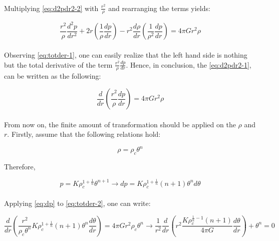 \documentclass[letterpaper,12pt]{article}
\begin{document}
\paragraph{}Multiplying \eqref{eq:d2pdr2-2} with $\frac{r^2}{\rho}$ and rearranging the terms yields:

\begin{equation}
    \label{eq:totder-1}
    \frac{r^2}{\rho}\frac{d^2p}{dr^2} + 2r\left(\frac{1}{\rho}\frac{dp}{dr}\right) - r^2\frac{d\rho}{dr}\left(\frac{1}{\rho^2}\frac{dp}{dr}\right) = 4\pi G r^2 \rho
\end{equation}

\paragraph{}Observing \eqref{eq:totder-1}, one can easily realize that the left hand side is nothing but the total derivative of the term $\frac{r^2}{\rho}\frac{dp}{dr}$. Hence, in conclusion, the \eqref{eq:d2pdr2-1}, can be written as the following:

\begin{equation}
    \label{eq:totder-2}
    \frac{d}{dr}\left(\frac{r^2}{\rho}\frac{dp}{dr}\right) = 4\pi G r^2 \rho
\end{equation}

\paragraph{} From now on, the finite amount of transformation should be applied on the $\rho$ and $r$. Firstly, assume that the following relations hold:

\begin{equation*}
    \rho = \rho_c \theta^n
\end{equation*}

Therefore, 

\begin{equation}
    \label{eq:dp}
    p = K \rho_c^{1+\frac{1}{n}} \theta^{n+1} \rightarrow dp = K \rho_c^{1+\frac{1}{n}} \left(n+1\right)\theta^n d\theta
\end{equation}

\paragraph{} Applying \eqref{eq:dp} to \eqref{eq:totder-2}, one can write:

\begin{equation}
    \frac{d}{dr}\left(\frac{r^2}{\rho_c \theta^n} K \rho_c^{1+\frac{1}{n}} \left(n+1\right)\theta^n \frac{d\theta}{dr}\right) = 4\pi G r^2 \rho_c \theta^n \rightarrow \frac{1}{r^2}\frac{d}{dr}\left(r^2 \frac{K \rho_c^{\frac{1}{n}-1} \left(n+1\right)}{4 \pi G} \frac{d\theta}{dr}\right) + \theta^n = 0
\end{equation}
\end{document}
